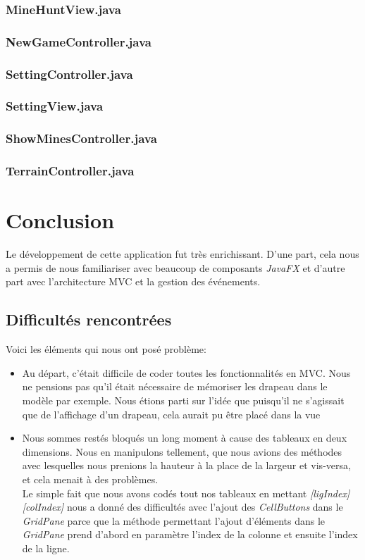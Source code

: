 \documentclass[a4paper, 10pt]{article}
\begin{document}
\subsubsection{MineHuntView.java}
\subsubsection{NewGameController.java}
\subsubsection{SettingController.java}
\subsubsection{SettingView.java}
\subsubsection{ShowMinesController.java}
\subsubsection{TerrainController.java}

\section{Conclusion}
Le développement de cette application fut très enrichissant. D'une part, cela nous a permis de nous familiariser avec beaucoup de composants \emph{JavaFX} et d'autre part avec l'architecture MVC et la gestion des événements.
\subsection{Difficultés rencontrées}
Voici les éléments qui nous ont posé problème:
\begin{itemize}
\item Au départ, c'était difficile de coder toutes les fonctionnalités en MVC. Nous ne pensions pas qu'il était nécessaire de mémoriser les drapeau dans le modèle par exemple. Nous étions parti sur l'idée que puisqu'il ne s'agissait que de l'affichage d'un drapeau, cela aurait pu être placé dans la vue
\item Nous sommes restés bloqués un long moment à cause des tableaux en deux dimensions. Nous en manipulons tellement, que nous avions des méthodes avec lesquelles nous prenions la hauteur à la place de la largeur et vis-versa, et cela menait à des problèmes.\\
Le simple fait que nous avons codés tout nos tableaux en mettant \emph{[ligIndex][colIndex]} nous a donné des difficultés avec l'ajout des \emph{CellButtons} dans le \emph{GridPane} parce que la méthode permettant l'ajout d'éléments dans le \emph{GridPane} prend d'abord en paramètre l'index de la colonne et ensuite l'index de la ligne. 
\end{itemize}
\end{document}
